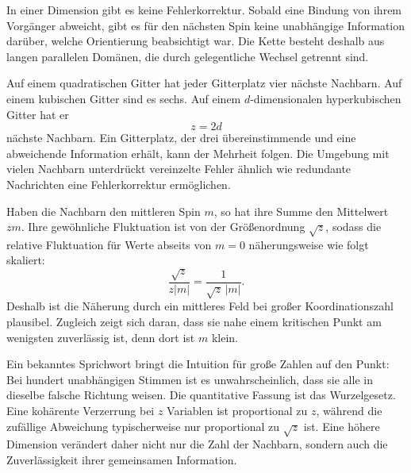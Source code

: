 In einer Dimension gibt es keine Fehlerkorrektur. Sobald eine Bindung von ihrem Vorgänger abweicht, gibt es für den nächsten Spin keine unabhängige Information darüber, welche Orientierung beabsichtigt war. Die Kette besteht deshalb aus langen parallelen Domänen, die durch gelegentliche Wechsel getrennt sind.

Auf einem quadratischen Gitter hat jeder Gitterplatz vier nächste Nachbarn. Auf einem kubischen Gitter sind es sechs. Auf einem \(d\)-dimensionalen hyperkubischen Gitter hat er
\begin{equation}
z=2d
\end{equation}
nächste Nachbarn. Ein Gitterplatz, der drei übereinstimmende und eine abweichende Information erhält, kann der Mehrheit folgen. Die Umgebung mit vielen Nachbarn unterdrückt vereinzelte Fehler ähnlich wie redundante Nachrichten eine Fehlerkorrektur ermöglichen.

Haben die Nachbarn den mittleren Spin \(m\), so hat ihre Summe den Mittelwert \(zm\). Ihre gewöhnliche Fluktuation ist von der Größenordnung \(\sqrt{z}\), sodass die relative Fluktuation für Werte abseits von \(m=0\) näherungsweise wie folgt skaliert:
\begin{equation}
\frac{\sqrt{z}}{z|m|}
=\frac{1}{\sqrt{z}\,|m|}.
\end{equation}
Deshalb ist die Näherung durch ein mittleres Feld bei großer Koordinationszahl plausibel. Zugleich zeigt sich daran, dass sie nahe einem kritischen Punkt am wenigsten zuverlässig ist, denn dort ist \(m\) klein.

Ein bekanntes Sprichwort bringt die Intuition für große Zahlen auf den Punkt: Bei hundert unabhängigen Stimmen ist es unwahrscheinlich, dass sie alle in dieselbe falsche Richtung weisen. Die quantitative Fassung ist das Wurzelgesetz. Eine kohärente Verzerrung bei \(z\) Variablen ist proportional zu \(z\), während die zufällige Abweichung typischerweise nur proportional zu \(\sqrt{z}\) ist. Eine höhere Dimension verändert daher nicht nur die Zahl der Nachbarn, sondern auch die Zuverlässigkeit ihrer gemeinsamen Information.

\begin{classroomqa}
\end{classroomqa}

